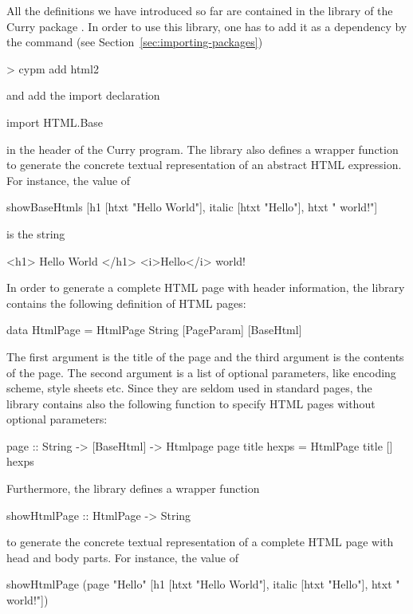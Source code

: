 %
All the definitions we have introduced so far are contained
in the library 
of the Curry package .
In order to use this library, one has to add it as a dependency
by the \cpm command (see Section~\ref{sec:importing-packages})
%
\begin{curry}
> cypm add html2
\end{curry}
%
and add the import declaration
\begin{curry}
import HTML.Base
\end{curry}
in the header of the Curry program.
The library  also defines a wrapper function
 to generate the concrete textual
representation of an abstract HTML expression. For instance, the value of
%
\begin{curry}
showBaseHtmls [h1 [htxt "Hello World"], italic [htxt "Hello"], htxt " world!"]
\end{curry}
%
is the string
%
\begin{curry}
<h1>
  Hello World
</h1>
<i>Hello</i>
world!
\end{curry}
%
In order to generate a complete HTML page with header information,
the library  contains the following definition of HTML pages:
\begin{curry}
data HtmlPage = HtmlPage String [PageParam] [BaseHtml]
\end{curry} 
The first argument is the title of the page
and the third argument is the contents of the page.
The second argument is a list of optional parameters,
like encoding scheme, style sheets etc.
Since they are seldom used in standard pages,
the library  contains also the following function
to specify HTML pages without optional parameters:
\begin{curry}
page :: String -> [BaseHtml] -> Htmlpage
page title hexps = HtmlPage title [] hexps
\end{curry}
%
Furthermore, the library  defines a wrapper function
\begin{curry}
showHtmlPage :: HtmlPage -> String
\end{curry}
to generate the concrete textual
representation of a complete HTML page with head and body parts.
For instance, the value of
%
\begin{curry}
showHtmlPage (page "Hello" [h1 [htxt "Hello World"],
                            italic [htxt "Hello"], htxt " world!"])
\end{curry}
